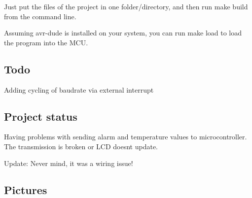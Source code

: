Just put the files of the project in one folder/directory, and then run {\ttfamily make build} from the command line.

Assuming avr-\/dude is installed on your system, you can run {\ttfamily make load} to load the program into the M\+CU.

\subsection*{Todo}

Adding cycling of baudrate via external interrupt

\subsection*{Project status}

Having problems with sending alarm and temperature values to microcontroller. The transmission is broken or L\+CD doesn\textquotesingle{}t update.

Update\+: Never mind, it was a wiring issue!

\subsection*{Pictures}

   